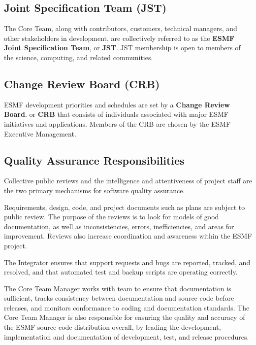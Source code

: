 \subsection{Joint Specification Team (JST)}
The Core Team, along with contributors, customers, technical
managers, and other stakeholders in development, are collectively
referred to as the {\bf ESMF Joint Specification Team}, or {\bf JST}.  
JST membership is open to members of the science, computing, and
related communities.

\subsection{Change Review Board (CRB)}
ESMF development priorities and schedules are set by a 
{\bf Change Review Board}. or {\bf CRB} that consists of individuals
associated with major ESMF initiatives and applications.  
Members of the CRB are chosen by the ESMF Executive Management.

\subsection{Quality Assurance Responsibilities}

Collective public reviews and the intelligence and attentiveness of
project staff are the two primary mechanisms for software quality assurance.  

Requirements, design, code, and project documents such as plans
are subject to public review.  The purpose of the reviews is
to look for models of good documentation, as well as inconsistencies,
errors, inefficiencies, and areas for improvement.  Reviews also
increase coordination and awareness within the ESMF project.

The Integrator ensures that support requests
and bugs are reported, tracked, and resolved, and that automated
test and backup scripts are operating correctly.

The Core Team Manager works with team to ensure that documentation
is sufficient, tracks consistency between documentation and source
code before releases, and monitors conformance to coding and
documentation standards.  The Core Team Manager is also responsible
for ensuring the quality and accuracy of the ESMF source code
distribution overall, by leading the development,
implementation and documentation of development, test, and release
procedures.










